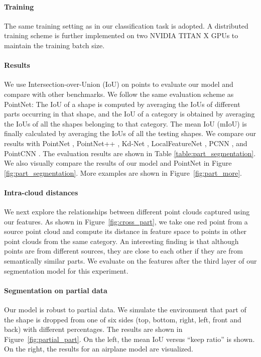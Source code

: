 \documentclass[acmtog]{acmart}
\begin{document}
\paragraph{Training} The same training setting as in our classification task is adopted. A distributed training scheme is further implemented on two NVIDIA TITAN X GPUs to maintain the training batch size.

\paragraph{Results} We use Intersection-over-Union (IoU) on points to evaluate our model and compare with other benchmarks.
We follow the same evaluation scheme as PointNet: The IoU of a shape is computed by averaging the IoUs of different parts occurring in that shape, and
the IoU of a category is obtained by averaging the IoUs of all the shapes belonging to that category.
The mean IoU (mIoU) is finally calculated by averaging the IoUs of all the testing shapes.
We compare our results with PointNet \cite{DBLP:journals/corr/QiSMG16}, PointNet++ \cite{DBLP:journals/corr/QiYSG17}, Kd-Net \cite{klokov2017escape}, LocalFeatureNet \cite{shen2017neighbors}, PCNN \cite{pcnn2018}, and PointCNN \cite{pointcnn}.
The evaluation results are shown in Table \ref{table:part_segmentation}.
We also visually compare the results of our model and PointNet in Figure \ref{fig:part_segmentation}. More examples are shown in Figure~\ref{fig:part_more}.

\paragraph{Intra-cloud distances} We next explore the relationships between different point clouds captured using our features. As shown in Figure~\ref{fig:cross_part}, we take one red point from a source point cloud and compute its distance in feature space to points in other point clouds from the same category. An interesting finding is that although points are from different sources, they are close to each other if they are from semantically similar parts. We evaluate on the features after the third layer of our segmentation model for this experiment. 

\paragraph{Segmentation on partial data} 

Our model is robust to partial data. We simulate the environment that part of the shape is dropped from one of six sides (top, bottom, right, left, front and back) with different percentages. The results are shown in Figure~\ref{fig:partial_part}. On the left, the mean IoU versus ``keep ratio'' is shown. On the right, the results for an airplane model are visualized.
\end{document}
